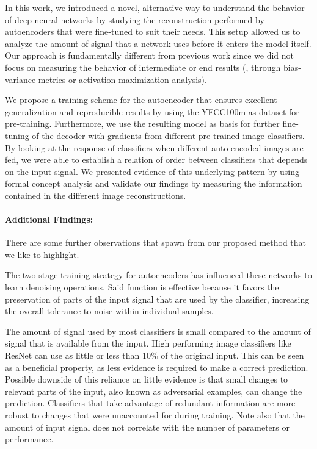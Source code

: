 \documentclass[10pt,twocolumn,a4paper]{article}
\begin{document}
In this work, we introduced a novel, alternative way to understand the behavior of deep neural networks by studying the reconstruction performed by autoencoders that were fine-tuned to suit their needs.
This setup allowed us to analyze the amount of signal that a network uses before it enters the model itself.
Our approach is fundamentally different from previous work since we did not focus on measuring the behavior of intermediate or end results (\eg, through bias-variance metrics or activation maximization analysis).

We propose a training scheme for the autoencoder that ensures excellent generalization and reproducible results by using the YFCC100m as dataset for pre-training.
Furthermore, we use the resulting model as basis for further fine-tuning of the decoder with gradients from different pre-trained image classifiers.
By looking at the response of classifiers when different auto-encoded images are fed, we were able to establish a relation of order between classifiers that depends on the input signal.
We presented evidence of this underlying pattern by using formal concept analysis and validate our findings by measuring the information contained in the different image reconstructions.

\vspace{-1.5em}\paragraph{Additional Findings:}
There are some further observations that spawn from our proposed method that we like to highlight.

The two-stage training strategy for autoencoders has influenced these networks to learn denoising operations.
Said function is effective because it favors the preservation of parts of the input signal that are used by the classifier, increasing the overall tolerance to noise within individual samples.

The amount of signal used by most classifiers is small compared to the amount of signal that is available from the input.
High performing image classifiers like ResNet can use as little or less than 10\% of the original input.
This can be seen as a beneficial property, as less evidence is required to make a correct prediction.
Possible downside of this reliance on little evidence is that small changes to relevant parts of the input, also known as adversarial examples, can change the prediction.
Classifiers that take advantage of redundant information are more robust to changes that were unaccounted for during training.
Note also that the amount of input signal does not correlate with the number of parameters or performance.
\end{document}
